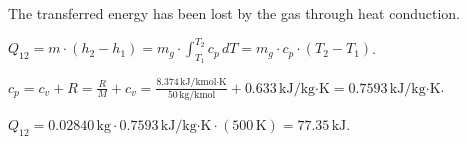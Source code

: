 The transferred energy has been lost by the gas through heat conduction.  

\( Q_{12} = m \cdot (h_2 - h_1) = m_g \cdot \int_{T_1}^{T_2} c_p \, dT = m_g \cdot c_p \cdot (T_2 - T_1) \).  

\( c_p = c_v + R = \frac{R}{M} + c_v = \frac{8.374 \, \text{kJ/kmol·K}}{50 \, \text{kg/kmol}} + 0.633 \, \text{kJ/kg·K} = 0.7593 \, \text{kJ/kg·K} \).  

\( Q_{12} = 0.02840 \, \text{kg} \cdot 0.7593 \, \text{kJ/kg·K} \cdot (500 \, \text{K}) = 77.35 \, \text{kJ} \).